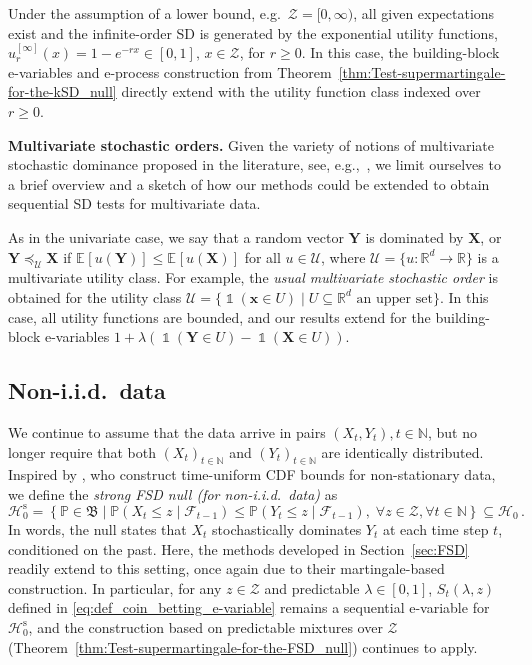 \documentclass[12pt,twoside]{article}
\theoremstyle{plain}
\theoremstyle{definition}
\theoremstyle{remark}
\newcommand{\inparen}[1]{\left(#1\right)}
\newcommand{\incurly}[1]{\left\{#1\right\}}
\DeclareMathOperator*{\indsymb}{\mathds{1}}
\newcommand{\indicator}[1]{\indsymb\inparen{#1}}
\newcommand{\N}{\mathbb{N}}
\newcommand{\R}{\mathbb{R}}
\newcommand{\calF}{\mathcal{F}}
\newcommand{\calH}{\mathcal{H}}
\newcommand{\calU}{\mathcal{U}}
\newcommand{\calZ}{\mathcal{Z}}
\newcommand{\Esymb}{\mathbb{E}}
\newcommand{\Psymb}{\mathbb{P}}
\newcommand{\Ex}[2]{\Esymb_{{#1}}\left[{#2}\right]}
\newcommand{\frakB}{\mathfrak{B}}
\newcommand{\bX}{\boldsymbol{X}}
\newcommand{\bY}{\boldsymbol{Y}}
\begin{document}
Under the assumption of a lower bound, e.g.\ $\mathcal{Z}=[0,\infty)$, all given expectations exist and the infinite-order SD is generated by the exponential utility functions, $u_r^{[\infty]}(x) = 1-e^{-rx} \in [0,1],\, x \in \calZ$, for $r \geq 0$. In this case, the building-block e-variables and e-process construction from Theorem~\ref{thm:Test-supermartingale-for-the-kSD_null} directly extend with the utility function class indexed over $r \geq 0$. 

\textbf{Multivariate stochastic orders. }
Given the variety of notions of multivariate stochastic dominance proposed in the literature, see, e.g.,\ \citet[Section 6]{shaked2007stochastic}, we limit ourselves to a brief overview and a sketch of how our methods could be extended to obtain sequential SD tests for multivariate data. 

As in the univariate case, we say that a random vector $\bY$ is dominated by $\bX$, or $\bY\preceq_\calU \bX$ if $\Ex{}{u(\bY)} \leq \Ex{}{u(\bX)}$ for all $u\in \calU$, where $\calU = \{u:\R^d \to \R\}$ is a multivariate utility class. 
For example, the \emph{usual multivariate stochastic order} is obtained for the utility class $\calU=\{\indicator{\boldsymbol{x} \in U}\mid U\subseteq \R^d\textrm{ an upper set}\}$. 
In this case, all utility functions are bounded, and our results extend for the building-block e-variables $1+\lambda (\indicator{\bY \in U}-\indicator{\bX \in U})$. 

\subsection{Non-i.i.d.\ data}\label{sec:non_iid_data}

We continue to assume that the data arrive in pairs $(X_t,Y_t), t\in \mathbb{N}$, but no longer require that both $(X_t)_{t\in \N}$ and $(Y_t)_{t\in \N}$ are identically distributed.
Inspired by \citet{mineiro2023nonstationarity}, who construct time-uniform CDF bounds for non-stationary data, we define the \emph{strong FSD null (for non-i.i.d.~data)} as 
\begin{equation}\label{eq:def_strong_FSD_null_for_non_stationary_data}
    \calH_0^\textrm{s} = \incurly{
        \Psymb \in \frakB \mid \Psymb(X_t\leq z\mid \calF_{t-1})\leq \Psymb(Y_t\leq z\mid \calF_{t-1}),\; \forall z\in \calZ,\forall t\in \N
    } \subseteq \calH_0\,.
\end{equation}
In words, the null states that $X_t$ stochastically dominates $Y_t$ at each time step $t$, conditioned on the past. 
Here, the methods developed in Section~\ref{sec:FSD} readily extend to this setting, once again due to their martingale-based construction.  
In particular, for any $z \in \calZ$ and predictable $\lambda\in [0,1]$, $S_t(\lambda, z)$ defined in \eqref{eq:def_coin_betting_e-variable} remains a sequential e-variable for $\calH_0^{\textrm{s}}$, and the construction based on predictable mixtures over $\calZ$ (Theorem~\ref{thm:Test-supermartingale-for-the-FSD_null}) continues to apply. 
\end{document}
